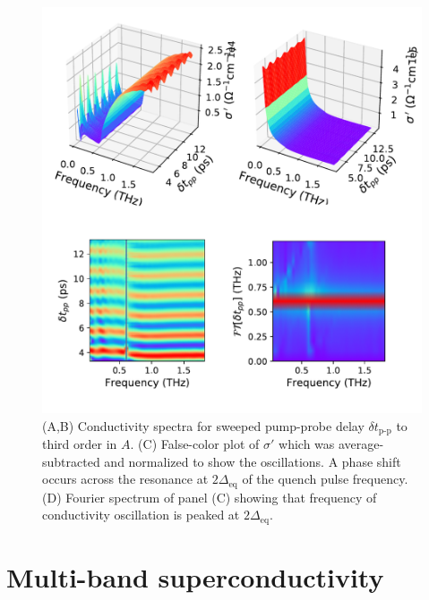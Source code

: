 \documentclass[aps,prb,reprint,noeprint,superscriptaddress]{revtex4-1}
\begin{document}
\begin{figure}[ht]
	\centering
	\includegraphics[width=\columnwidth]{figures/fig3.pdf}
	\caption{(A,B) Conductivity spectra for sweeped pump-probe delay $\delta
	t_{\text{p-p}}$ to third order in $A$. (C) False-color plot of
$\sigma' $ which was average-subtracted and normalized to show the oscillations.
A phase shift occurs across the resonance at $2\Delta_{\text{eq}}$ of the quench pulse
frequency. (D) Fourier spectrum of panel (C) showing that frequency of
conductivity oscillation is peaked at $2\Delta_{\text{eq}}$.}
\end{figure}
\section{Multi-band superconductivity}
\label{sec:multiband}
\end{document}
